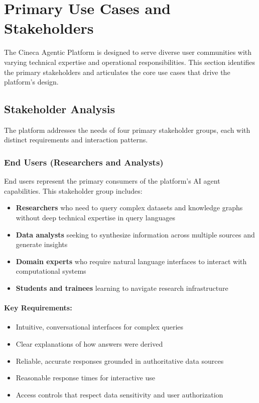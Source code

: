 
\section{Primary Use Cases and Stakeholders}
\label{sec:use-cases-stakeholders}

The Cineca Agentic Platform is designed to serve diverse user communities with varying technical expertise and operational responsibilities. This section identifies the primary stakeholders and articulates the core use cases that drive the platform's design.

\subsection{Stakeholder Analysis}

The platform addresses the needs of four primary stakeholder groups, each with distinct requirements and interaction patterns.

\subsubsection{End Users (Researchers and Analysts)}

End users represent the primary consumers of the platform's AI agent capabilities. This stakeholder group includes:

\begin{itemize}
    \item \textbf{Researchers} who need to query complex datasets and knowledge graphs without deep technical expertise in query languages
    \item \textbf{Data analysts} seeking to synthesize information across multiple sources and generate insights
    \item \textbf{Domain experts} who require natural language interfaces to interact with computational systems
    \item \textbf{Students and trainees} learning to navigate research infrastructure
\end{itemize}

\paragraph{Key Requirements:}
\begin{itemize}
    \item Intuitive, conversational interfaces for complex queries
    \item Clear explanations of how answers were derived
    \item Reliable, accurate responses grounded in authoritative data sources
    \item Reasonable response times for interactive use
    \item Access controls that respect data sensitivity and user authorization
\end{itemize}

